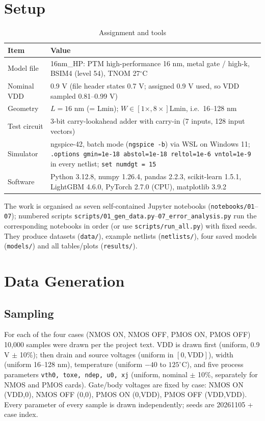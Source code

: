 \documentclass[11pt,a4paper]{article}
\begin{document}
\section{Setup}
\begin{table}[H]\centering\small
\caption{Assignment and tools}
\begin{tabular}{p{3.2cm}p{11.4cm}}\toprule
Item & Value\\\midrule
Model file & 16nm\_HP: PTM high-performance 16 nm, metal gate / high-k, BSIM4 (level 54), TNOM 27$^\circ$C\\
Nominal VDD & 0.9 V (file header states 0.7 V; assigned 0.9 V used, so VDD sampled 0.81--0.99 V)\\
Geometry & $L = 16$ nm (= Lmin); $W \in [1\times, 8\times]$Lmin, i.e.\ 16--128 nm\\
Test circuit & 3-bit carry-lookahead adder with carry-in (7 inputs, 128 input vectors)\\
Simulator & ngspice-42, batch mode (\texttt{ngspice -b}) via WSL on Windows 11; \texttt{.options gmin=1e-18 abstol=1e-18 reltol=1e-6 vntol=1e-9} in every netlist; \texttt{set numdgt = 15}\\
Software & Python 3.12.8, numpy 1.26.4, pandas 2.2.3, scikit-learn 1.5.1, LightGBM 4.6.0, PyTorch 2.7.0 (CPU), matplotlib 3.9.2\\
\bottomrule\end{tabular}\end{table}

The work is organised as seven self-contained Jupyter notebooks (\texttt{notebooks/01}--\texttt{07}); numbered scripts \texttt{scripts/01\_gen\_data.py}--\texttt{07\_error\_analysis.py} run the corresponding notebooks in order (or use \texttt{scripts/run\_all.py}) with fixed seeds. They produce datasets (\texttt{data/}), example netlists (\texttt{netlists/}), four saved models (\texttt{models/}) and all tables/plots (\texttt{results/}).

\section{Data Generation}

\subsection{Sampling}
For each of the four cases (NMOS ON, NMOS OFF, PMOS ON, PMOS OFF) 10{,}000 samples were drawn per the project text. VDD is drawn first (uniform, 0.9 V $\pm$ 10\%); then drain and source voltages (uniform in $[0,\mathrm{VDD}]$), width (uniform 16--128 nm), temperature (uniform $-40$ to $125^\circ$C), and five process parameters \texttt{vth0, toxe, ndep, u0, xj} (uniform, nominal $\pm$ 10\%, separately for NMOS and PMOS cards). Gate/body voltages are fixed by case: NMOS ON (VDD,0), NMOS OFF (0,0), PMOS ON (0,VDD), PMOS OFF (VDD,VDD). Every parameter of every sample is drawn independently; seeds are 20261105 + case index.
\end{document}
